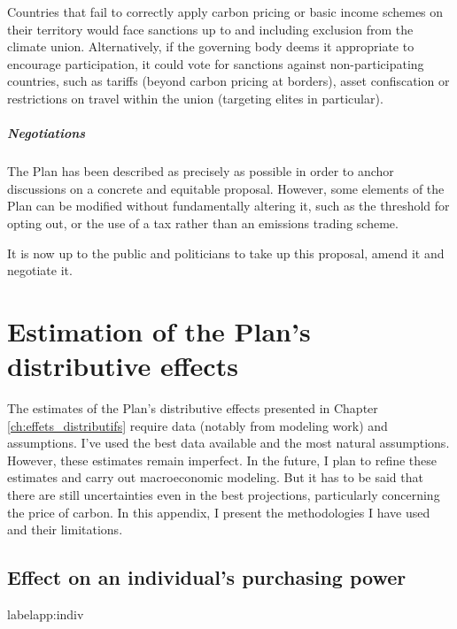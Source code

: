 \documentclass[a5paper,french,openany]{memoir}
\begin{document}
Countries that fail to correctly apply carbon pricing or basic income schemes on their territory would face sanctions up to and including exclusion from the climate union. 
Alternatively, if the governing body deems it appropriate to encourage participation, it could vote for sanctions against non-participating countries, such as tariffs (beyond carbon pricing at borders), asset confiscation or restrictions on travel within the union (targeting elites in particular). 

\paragraph{Negotiations}

The Plan has been described as precisely as possible in order to anchor discussions on a concrete and equitable proposal. However, some elements of the Plan can be modified without fundamentally altering it, such as the threshold for opting out, or the use of a tax rather than an emissions trading scheme. 

It is now up to the public and politicians to take up this proposal, amend it and negotiate it.



\chapter{Estimation of the Plan's distributive effects
}\label{ch:methodo}

The estimates of the Plan's distributive effects presented in Chapter \ref{ch:effets_distributifs} require data (notably from modeling work) and assumptions. 
I've used the best data available and the most natural assumptions. However, these estimates remain imperfect. In the future, I plan to refine these estimates and carry out macroeconomic modeling. But it has to be said that there are still uncertainties even in the best projections, particularly concerning the price of carbon. 
In this appendix, I present the methodologies I have used and their limitations.

\section{Effect on an individual's purchasing power}label{app:indiv}
\end{document}
